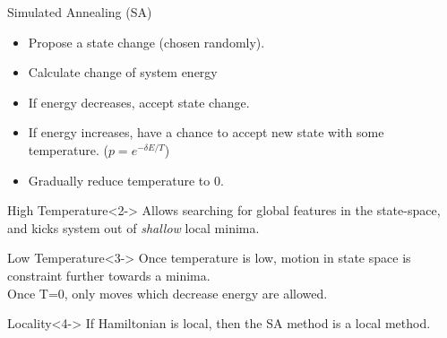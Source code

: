 \documentclass[10pt]{beamer}
\begin{document}
\begin{frame}[fragile]{Simulated Annealing (SA)}
    \begin{itemize}
        \item Propose a state change (chosen randomly).
        \item Calculate change of system energy
        \item If energy decreases, accept state change.
        \item If energy increases, have a chance to accept new state with some temperature. ($p=e^{-\delta E / T}$)
        \item Gradually reduce temperature to 0.
    \end{itemize}
    \begin{alertblock}{\centering High Temperature}<2->
        Allows searching for global features in the state-space,
        and kicks system out of \textit{shallow} local minima.
    \end{alertblock}
    \begin{exampleblock}{\centering Low Temperature}<3->
        Once temperature is low, motion in state space is constraint further
        towards a minima. \\
        Once T=0, only moves which decrease energy are allowed.
    \end{exampleblock}
    \begin{block}{Locality}<4->
        If Hamiltonian is local, then the SA method is a local method.
    \end{block}
\end{frame}
\end{document}
